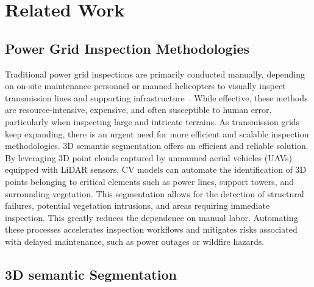 \section{Related Work~\label{sec:related_work}
}

\subsection{Power Grid Inspection Methodologies}

Traditional power grid inspections are primarily conducted manually, depending on on-site maintenance personnel or manned helicopters to visually inspect transmission lines and supporting infrastructure~\cite{lavado2024ts40k}. 
While effective, these methods are resource-intensive, expensive, and often susceptible to human error, particularly when inspecting large and intricate terrains. As transmission grids keep expanding, there is an urgent need for more efficient and scalable inspection methodologies.
%
3D semantic segmentation offers an efficient and reliable solution. By leveraging 3D point clouds captured by unmanned aerial vehicles (UAVs) equipped with LiDAR sensors, CV models can automate the identification of 3D points belonging to critical elements such as power lines, support towers, and surrounding vegetation. 
%
This segmentation allows for the detection of structural failures, potential vegetation intrusions, and areas requiring immediate inspection. This greatly reduces the dependence on manual labor. 
Automating these processes accelerates inspection workflows and mitigates risks associated with delayed maintenance, such as power outages or wildfire hazards.



\subsection{3D semantic Segmentation}

